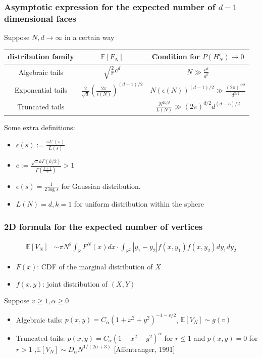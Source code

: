 \documentclass{beamer}
\def\E{\mathbb{E}}
\def\R{\mathbb{R}}
\begin{document}
\begin{frame}
    \frametitle{Asymptotic expression for the expected number of $d-1$ dimensional faces}
    Suppose $N,d \to \infty$ in a certain way
    \begin{table}
    \begin{tabular}{|c|c|c|}
        \hline
        distribution family & $\E[F_N]$ & Condition for $P(H_N^c) \to 0$ \\
        \hline
       Algebraic tails & $\sqrt{\frac{2}{\pi}}
       c^d$
       & $N\gg \frac{c^d}{d^2}$ \\
       \hline
       Exponential tails & $\frac{2}{\sqrt{d}} (\frac{2\pi}{\epsilon(N)})^{(d-1)/2}$
       & $ N (\epsilon(N))^{(d-1)/2} \gg \frac{(2\pi)^{d/2}}{d^{3/2}}$ \\
       \hline
       Truncated tails & 
       & $\frac{N^{2k/d}}{L(N)}
       \gg (2\pi)^{d/2}d^{(d-5)/2}$\\
       \hline
    \end{tabular}
\end{table}
Some extra definitions:
\begin{itemize}
\item $\epsilon(s):=\frac{sL'(s)}{L(s)}$
\item $c:=\frac{\sqrt{\pi}k\Gamma(k/2)}{\Gamma(\frac{k+1}{2})}>1$
\item $\epsilon(s)=\frac{1}{2\log s}$ for Gaussian distribution.
\item $L(N)=d,k=1$ for uniform distribution within the sphere
\end{itemize}
\end{frame}
\begin{frame}
    \frametitle{
        2D formula for the expected number of vertices
    }
    \begin{align*}
        \E[V_N]
        & \sim \pi N^2 \int_{\R} F^{N}(x) dx \cdot \int_{\R^2} |y_1-y_2| f(x, y_1) f(x,y_2)dy_1dy_2
    \end{align*}
    \begin{itemize}
        \item $F(x)$: CDF of the marginal distribution of $X$
        \item $f(x,y)$: joint distribution of $(X,Y)$
    \end{itemize}
    Suppose  $v\geq 1, \alpha \geq 0$
    \begin{itemize}
        \item Algebraic tails: $p(x,y) = C_{\alpha}(1+x^2+y^2)^{-1-v/2}$,
        $\E[V_N] \sim g(v)$
        \item Truncated tails: $p(x,y) = C_{\alpha}(1-x^2-y^2)^{\alpha}$ for $r\leq 1$ and $p(x,y)=0$ for $r>1$
        ,$\E[V_N] \sim D_{\alpha} N^{1/(2\alpha + 3)}$ [Affentranger, 1991]
    \end{itemize}
\end{frame}
\end{document}

